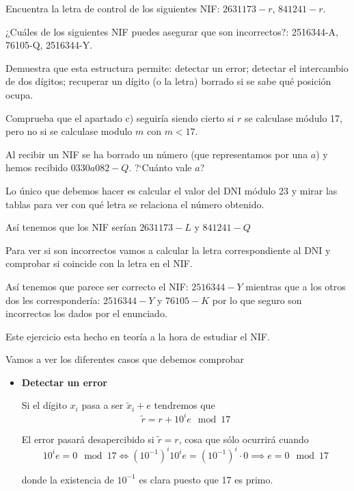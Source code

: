 \begin{problem}[3]
\begin{center}
\end{center}
\normalsize
\ppart Encuentra la letra de control de los siguientes NIF:
$2631173-r$, $841241-r$.

\ppart ¿Cuáles de los siguientes NIF puedes asegurar que son
incorrectos?: 2516344-A, 76105-Q, 2516344-Y.

\ppart Demuestra que esta estructura permite: detectar un error;
detectar el intercambio de dos dígitos; recuperar un dígito (o la
letra) borrado si se sabe qué posición ocupa.

\ppart Comprueba que el apartado c) seguiría siendo cierto si $r$ se
calculase módulo 17, pero no si se calculase modulo $m$ con
$m<17$.

\ppart Al recibir un NIF se ha borrado un número (que representamos
por una $a$) y hemos recibido $0330a082-Q$. ?`Cuánto vale $a$?
\solution


\spart

Lo único que debemos hacer es calcular el valor del DNI módulo 23 y mirar las tablas para ver con qué letra se relaciona el número obtenido.

Así tenemos que los NIF serían $2631173-L$ y $841241-Q$

\spart

Para ver si son incorrectos vamos a calcular la letra correspondiente al DNI y comprobar si coincide con la letra en el NIF.

Así tenemos que parece ser correcto el NIF: $2516344-Y$ mientras que a los otros dos les correspondería: $2516344-Y$ y $76105-K$ por lo que seguro son incorrectos los dados por el enunciado.

\spart

Este ejercicio esta hecho en teoría a la hora de estudiar el NIF.

\spart

Vamos a ver los diferentes casos que debemos comprobar
\begin{itemize}
\item \textbf{Detectar un error}

Si el dígito $x_i$ pasa a ser $\tilde{x}_i+e$ tendremos que
\[\tilde{r} = r + 10^ie \mod 17\]

El error pasará desapercibido si $\tilde{r}=r$, cosa que sólo ocurrirá cuando
\[10^ie = 0 \mod 17 \iff (10^{-1})^i10^ie=(10^{-1})^i\cdot 0 \implies e = 0 \mod 17\]

donde la existencia de $10^{-1}$ es clara puesto que 17 es primo.


\end{itemize}
\end{problem}

